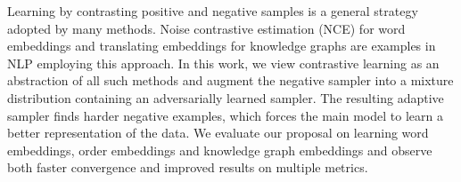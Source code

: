 Learning by contrasting positive and negative samples is a general strategy adopted by many methods. Noise contrastive estimation (NCE) for word embeddings and translating embeddings for knowledge graphs are examples in NLP employing this approach. In this work, we view contrastive learning as an abstraction of all such methods and augment the negative sampler into a mixture distribution containing an adversarially learned sampler. The resulting adaptive sampler finds harder negative examples, which forces the main model to learn a better representation of the data. We evaluate our proposal on learning word embeddings, order embeddings and knowledge graph embeddings and observe both faster convergence and improved results on multiple metrics.
